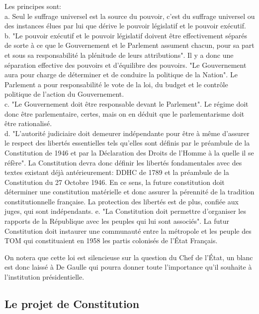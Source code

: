 \documentclass[12pt, a4paper, openany]{book}
\begin{document}
Les principes sont: \\
a. Seul le suffrage universel est la source du pouvoir, c'est du suffrage universel ou des instances élues par lui que dérive le pouvoir législatif et le pouvoir exécutif. \\
b. "Le pouvoir exécutif et le pouvoir législatif doivent être effectivement séparés de sorte à ce que le Gouvernement et le Parlement assument chacun, pour sa part et sous sa responsabilité la plénitude de leurs attributions". Il y a donc une séparation effective des pouvoirs et d'équilibre des pouvoirs. "Le Gouvernement aura pour charge de déterminer et de conduire la politique de la Nation". Le Parlement a pour responsabilité le vote de la loi, du budget et le contrôle politique de l'action du Gouvernement. \\
c. "Le Gouvernement doit être responsable devant le Parlement". Le régime doit donc être parlementaire, certes, mais on en déduit que le parlementarisme doit être rationalisé. \\
d. "L'autorité judiciaire doit demeurer indépendante pour être à même d'assurer le respect des libertés essentielles tels qu'elles sont définis par le préambule de la Constitution de 1946 et par la Déclaration des Droits de l'Homme à la quelle il se réfère". La Constitution devra donc définir les libertés fondamentales avec des textes existant déjà antérieurement: DDHC de 1789 et la préambule de la Constitution du 27 Octobre 1946. En ce sens, la future constitution doit déterminer une constitution matérielle et donc assurer la pérennité de la tradition constitutionnelle française. La protection des libertés est de plus, confiée aux juges, qui sont indépendants. 
e. "La Constitution doit permettre d'organiser les rapports de la République avec les peuples qui lui sont associés". La futur Constitution doit instaurer une communauté entre la métropole et les peuple des TOM qui constituaient en 1958 les partis colonisés de l'État Français. 


On notera que cette loi est silencieuse sur la question du Chef de l'État, un blanc est donc laissé à De Gaulle qui pourra donner toute l'importance qu'il souhaite à l'institution présidentielle. 

\subsection{Le projet de Constitution}
\end{document}
